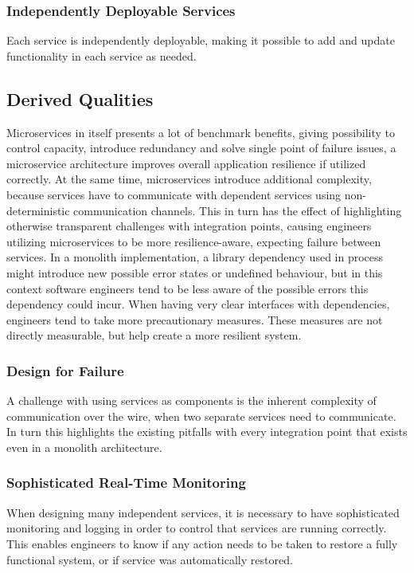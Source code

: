 {\subsubsection*{Independently Deployable Services}
Each service is independently deployable, making it possible to add and update functionality in each service as needed.

\subsection{Derived Qualities}
Microservices in itself presents a lot of benchmark benefits, giving possibility to control capacity, introduce redundancy and solve single point of failure issues, a microservice architecture improves overall application resilience if utilized correctly. At the same time, microservices introduce additional complexity, because services have to communicate with dependent services using non-deterministic communication channels. This in turn has the effect of highlighting otherwise transparent challenges with integration points, causing engineers utilizing microservices to be more resilience-aware, expecting failure between services. In a monolith implementation, a library dependency used in process might introduce new possible error states or undefined behaviour, but in this context software engineers tend to be less aware of the possible errors this dependency could incur. When having very clear interfaces with dependencies, engineers tend to take more precautionary measures. These measures are not directly measurable, but help create a more resilient system. 

\subsubsection*{Design for Failure}
A challenge with using services as components is the inherent complexity of communication over the wire, when two separate services need to communicate. In turn this highlights the existing pitfalls with every integration point that exists even in a monolith architecture.

\subsubsection*{Sophisticated Real-Time Monitoring}
When designing many independent services, it is necessary to have sophisticated monitoring and logging in order to control that services are running correctly. This enables engineers to know if any action needs to be taken to restore a fully functional system, or if service was automatically restored.

}
